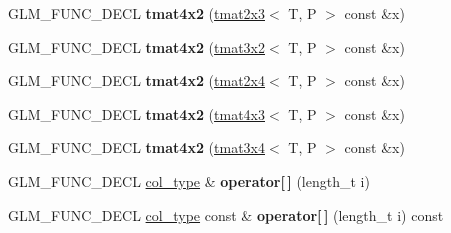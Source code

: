 \begin{DoxyCompactItemize}
\item 
G\+L\+M\+\_\+\+F\+U\+N\+C\+\_\+\+D\+E\+CL {\bfseries tmat4x2} (\hyperlink{structglm_1_1detail_1_1tmat2x3}{tmat2x3}$<$ T, P $>$ const \&x)\hypertarget{structglm_1_1detail_1_1tmat4x2_af72c0575d3315a1a7b434dabcefea5aa}{}\label{structglm_1_1detail_1_1tmat4x2_af72c0575d3315a1a7b434dabcefea5aa}

\item 
G\+L\+M\+\_\+\+F\+U\+N\+C\+\_\+\+D\+E\+CL {\bfseries tmat4x2} (\hyperlink{structglm_1_1detail_1_1tmat3x2}{tmat3x2}$<$ T, P $>$ const \&x)\hypertarget{structglm_1_1detail_1_1tmat4x2_adbb464ba1329c45ae931b2825114d6cf}{}\label{structglm_1_1detail_1_1tmat4x2_adbb464ba1329c45ae931b2825114d6cf}

\item 
G\+L\+M\+\_\+\+F\+U\+N\+C\+\_\+\+D\+E\+CL {\bfseries tmat4x2} (\hyperlink{structglm_1_1detail_1_1tmat2x4}{tmat2x4}$<$ T, P $>$ const \&x)\hypertarget{structglm_1_1detail_1_1tmat4x2_abfac9500ea47ed389da5d877b7b7d716}{}\label{structglm_1_1detail_1_1tmat4x2_abfac9500ea47ed389da5d877b7b7d716}

\item 
G\+L\+M\+\_\+\+F\+U\+N\+C\+\_\+\+D\+E\+CL {\bfseries tmat4x2} (\hyperlink{structglm_1_1detail_1_1tmat4x3}{tmat4x3}$<$ T, P $>$ const \&x)\hypertarget{structglm_1_1detail_1_1tmat4x2_a0f0e6e3e2d0a7bc9d9979a132c410298}{}\label{structglm_1_1detail_1_1tmat4x2_a0f0e6e3e2d0a7bc9d9979a132c410298}

\item 
G\+L\+M\+\_\+\+F\+U\+N\+C\+\_\+\+D\+E\+CL {\bfseries tmat4x2} (\hyperlink{structglm_1_1detail_1_1tmat3x4}{tmat3x4}$<$ T, P $>$ const \&x)\hypertarget{structglm_1_1detail_1_1tmat4x2_a810689bea267f9f6fc548ad4e237a2a3}{}\label{structglm_1_1detail_1_1tmat4x2_a810689bea267f9f6fc548ad4e237a2a3}

\item 
G\+L\+M\+\_\+\+F\+U\+N\+C\+\_\+\+D\+E\+CL \hyperlink{structglm_1_1detail_1_1tvec2}{col\+\_\+type} \& {\bfseries operator\mbox{[}$\,$\mbox{]}} (length\+\_\+t i)\hypertarget{structglm_1_1detail_1_1tmat4x2_a63321d20fd080a74dbd14953d339d6fc}{}\label{structglm_1_1detail_1_1tmat4x2_a63321d20fd080a74dbd14953d339d6fc}

\item 
G\+L\+M\+\_\+\+F\+U\+N\+C\+\_\+\+D\+E\+CL \hyperlink{structglm_1_1detail_1_1tvec2}{col\+\_\+type} const \& {\bfseries operator\mbox{[}$\,$\mbox{]}} (length\+\_\+t i) const \hypertarget{structglm_1_1detail_1_1tmat4x2_a3a3555e29c0cd136cd1ba1ddd741c314}{}\label{structglm_1_1detail_1_1tmat4x2_a3a3555e29c0cd136cd1ba1ddd741c314}


\end{DoxyCompactItemize}
